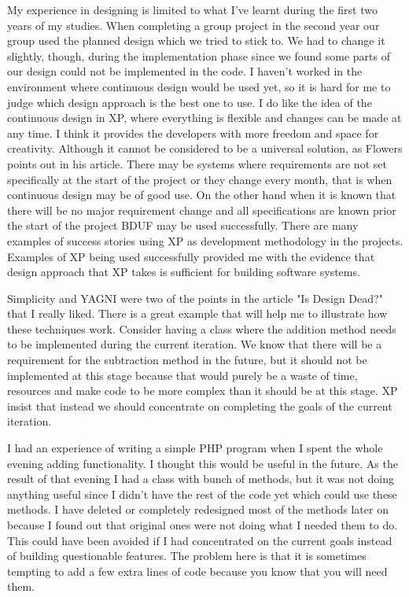 \documentclass[]{report}
\begin{document}
My experience in designing is limited to what I've learnt during the first two years of my studies. When completing a group project in the second year our group used the planned design which we tried to stick to. We had to change it slightly, though, during the implementation phase since we found some parts of our design could not be implemented in the code. I haven't worked in the environment where continuous design would be used yet, so it is hard for me to judge which design approach is the best one to use. I do like the idea of the continuous design in XP, where everything is flexible and changes can be made at any time. I think it provides the developers with more freedom and space for creativity. Although it cannot be considered to be a universal solution, as Flowers points out in his article\cite{IsDesignDead}. There may be systems where requirements are not set specifically at the start of the project or they change every month, that is when continuous design may be of good use\cite{WhenUseXP}. On the other hand when it is known that there will be no major requirement change and all specifications are known prior the start of the project BDUF may be used successfully. There are many examples of success stories using XP as development methodology in the projects\cite{SuccessfulXPProjects}. Examples of XP being used successfully provided me with the evidence that design approach that XP takes is sufficient for building software systems.

Simplicity and YAGNI were two of the points in the article "Is Design Dead?" that I really liked. There is a great example that will help me to illustrate how these techniques work. Consider having a class where the addition method needs to be implemented during the current iteration. We know that there will be a requirement for the subtraction method in the future, but it should not be implemented at this stage because that would purely be a waste of time, resources and make code to be more complex than it should be at this stage. XP insist that instead we should concentrate on completing the goals of the current iteration. 

I had an experience of writing a simple PHP program when I spent the whole evening adding functionality. I thought this would be useful in the future. As the result of that evening I had a class with bunch of methods, but it was not doing anything useful since I didn't have the rest of the code yet which could use these methods. I have deleted or completely redesigned most of the methods later on because I found out that original ones were not doing what I needed them to do. This could have been avoided if I had concentrated on the current goals instead of building questionable features. The problem here is that it is sometimes tempting to add a few extra lines of code because you know that you will need them.
\end{document}
